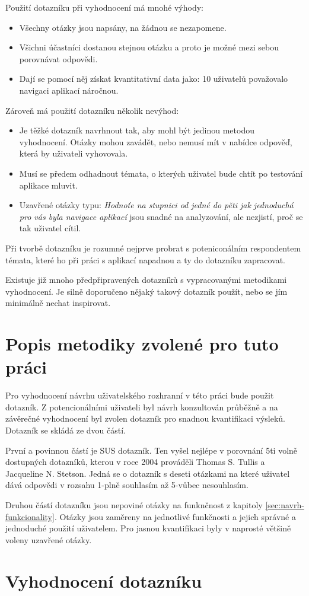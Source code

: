 Použití dotazníku při vyhodnocení má mnohé výhody\cite{stone2005user}:
\begin{itemize}
\item Všechny otázky jsou napsány, na žádnou se nezapomene.
\item Všichni účastníci dostanou stejnou otázku a proto je možné mezi sebou porovnávat odpovědi.
\item Dají se pomocí něj získat kvantitativní data jako: 10 uživatelů považovalo navigaci aplikací náročnou.
\end{itemize}
Zároveň má použití dotazníku několik nevýhod\cite{stone2005user}:
\begin{itemize}
\item Je těžké dotazník navrhnout tak, aby mohl být jedinou metodou vyhodnocení. Otázky mohou zavádět, nebo nemusí mít v nabídce odpověď, která by uživateli vyhovovala.
\item Musí se předem odhadnout témata, o kterých uživatel bude chtít po testování aplikace mluvit.
\item Uzavřené otázky typu: \emph{Hodnoťe na stupnici od jedné do pěti jak jednoduchá pro vás byla navigace aplikací} jsou snadné na analyzování, ale nezjistí, proč se tak uživatel cítil.
\end{itemize}

Při tvorbě dotazníku je rozumné nejprve probrat s poteniconálním respondentem témata, které ho při práci s aplikací napadnou a ty do dotazníku zapracovat\cite{stone2005user}.

Existuje již mnoho předpřipravených dotazníků s vypracovanými metodikami vyhodnocení. Je silně doporučeno nějaký takový dotazník použít, nebo se jím minimálně nechat inspirovat\cite{stone2005user}.

\section{Popis metodiky zvolené pro tuto práci}
Pro vyhodnocení návrhu uživatelského rozhranní v této práci bude použit dotazník. Z potencionálními uživateli byl návrh konzultován průběžně a na závěrečné vyhodnocení byl zvolen dotazník pro snadnou kvantifikaci výsleků. Dotazník se skládá ze dvou částí.

První a povinnou částí je SUS dotazník. Ten vyšel nejlépe v porovnání 5ti volně dostupných dotazníků, kterou v roce 2004 prováděli Thomas S. Tullis a Jacqueline N. Stetson\cite{tullis2004comparison}. Jedná se o dotazník s deseti otázkami na které uživatel dává odpovědi v rozsahu 1-plně souhlasím až 5-vůbec nesouhlasím.

Druhou částí dotazníku jsou nepoviné otázky na funknčnost z kapitoly \ref{sec:navrh-funkcionality}. Otázky jsou zaměreny na jednotlivé funkčnosti a jejich správné a jednoduché použití uživatelem. Pro jasnou kvantifikaci byly v naprosté většině voleny uzavřené otázky.


\section{Vyhodnocení dotazníku}
